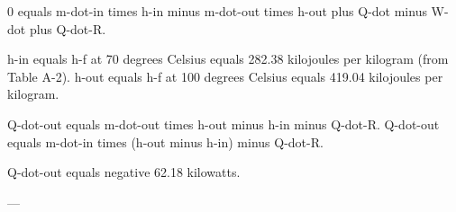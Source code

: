 0 equals m-dot-in times h-in minus m-dot-out times h-out plus Q-dot minus W-dot plus Q-dot-R.  

h-in equals h-f at 70 degrees Celsius equals 282.38 kilojoules per kilogram (from Table A-2).  
h-out equals h-f at 100 degrees Celsius equals 419.04 kilojoules per kilogram.  

Q-dot-out equals m-dot-out times h-out minus h-in minus Q-dot-R.  
Q-dot-out equals m-dot-in times (h-out minus h-in) minus Q-dot-R.  

Q-dot-out equals negative 62.18 kilowatts.  

---